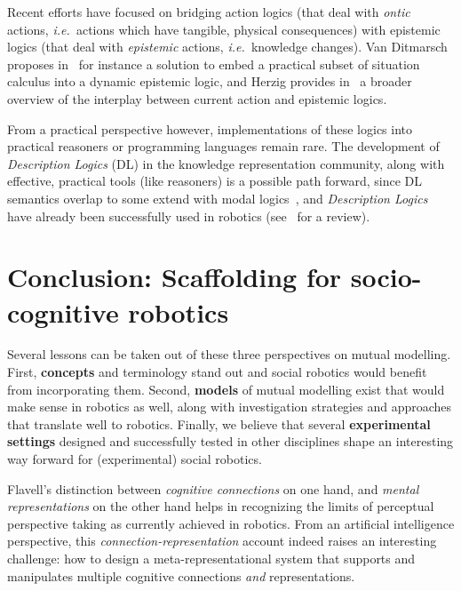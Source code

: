 \documentclass{sig-alternate}
\newcommand{\ie}{{\textit{i.e.~}}}
\begin{document}
Recent efforts have focused on bridging action logics (that deal with
\emph{ontic} actions, \ie actions which have tangible, physical consequences)
with epistemic logics (that deal with \emph{epistemic} actions, \ie knowledge
changes). Van Ditmarsch proposes in~\cite{ditmarsch2010from} for instance a
solution to embed a practical subset of situation calculus into a dynamic
epistemic logic, and Herzig provides in~\cite{herzig2014logics} a broader
overview of the interplay between current action and epistemic logics.

From a practical perspective however, implementations of these logics into
practical reasoners or programming languages remain rare. The development of
\emph{Description Logics} (DL) in the knowledge representation community, along
with effective, practical tools (like reasoners) is a possible path forward,
since DL semantics overlap to some extend with modal logics~\cite[chap.
4.2.2]{baader2003description}, and \emph{Description Logics} have already been
successfully used in robotics (see~\cite{lemaignan2012symbolic} for a review).


\section{Conclusion: Scaffolding for socio-cognitive robotics}

Several lessons can be taken out of these three perspectives on mutual modelling.
First, \textbf{concepts} and terminology stand out and social robotics would
benefit from incorporating them. Second, \textbf{models} of mutual modelling exist
that would make sense in robotics as well, along with investigation strategies
and approaches that translate well to robotics. Finally, we believe that several
\textbf{experimental settings} designed and successfully tested in other
disciplines shape an interesting way forward for (experimental) social robotics.

Flavell's distinction between \emph{cognitive connections} on one hand, and
\emph{mental representations} on the other hand helps in recognizing
the limits of perceptual perspective taking as currently achieved in robotics.
From an artificial intelligence perspective, this
\emph{connection-representation} account indeed raises an interesting challenge:
how to design a meta-representational system that supports and manipulates
multiple cognitive connections \emph{and} representations.
\end{document}
